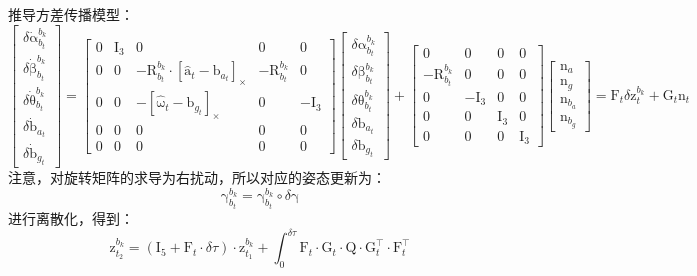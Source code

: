 \documentclass[12pt, onecolumn]{article}
\newcommand\liehat[1]{\left[ #1 \right]_\times}
\newcommand\bsm[1]{\boldsymbol{\mathrm{#1}}}
\newcommand\rotation[2]{{\bsm{R}_{#1}^{#2}}}
\begin{document}
	推导方差传播模型：
	\begin{equation}
	\begin{bmatrix}
	\delta\dot{\bsm{\alpha}}_{b_{t}}^{b_k}
	\\
	\delta\dot{\bsm{\beta}}_{b_{t}}^{b_k}
	\\
	\delta\dot{\bsm{\theta}}_{b_{t}}^{b_k}
	\\
	\delta\dot{\bsm{b}}_{a_{t}}
	\\
	\delta\dot{\bsm{b}}_{g_{t}}
	\end{bmatrix}=
	\begin{bmatrix}
	0&\bsm{I}_3&0&0&0\\
	0&0&-\rotation{b_t}{b_{k}}\cdot\liehat{\hat{\bsm{a}}_t-\bsm{b}_{a_t}}&-\rotation{b_t}{b_{k}}&0\\
	0&0&-\liehat{\hat{\bsm{\omega}}_t-\bsm{b}_{g_t}}&0&-\bsm{I}_3\\
	0&0&0&0&0\\0&0&0&0&0
	\end{bmatrix}
	\begin{bmatrix}
	\delta{\bsm{\alpha}}_{b_{t}}^{b_k}
	\\
	\delta{\bsm{\beta}}_{b_{t}}^{b_k}
	\\
	\delta{\bsm{\theta}}_{b_{t}}^{b_k}
	\\
	\delta{\bsm{b}}_{a_{t}}
	\\
	\delta{\bsm{b}}_{g_{t}}
	\end{bmatrix}+
	\begin{bmatrix}
	0&0&0&0\\
	-\rotation{b_t}{b_{k}}&0&0&0\\
	0&-\bsm{I}_3&0&0\\
	0&0&\bsm{I}_3&0\\
	0&0&0&\bsm{I}_3
	\end{bmatrix}\begin{bmatrix}
	\bsm{n}_a\\\bsm{n}_g\\\bsm{n}_{b_a}\\\bsm{n}_{b_g}
	\end{bmatrix}=\bsm{F}_t\delta\bsm{z}^{b_k}_{t}+\bsm{G}_{t}\bsm{n}_{t}
	\end{equation}
	注意，对旋转矩阵的求导为右扰动，所以对应的姿态更新为：
	\begin{equation}
	\bsm{\gamma}_{b_{t}}^{b_k}=\bsm{\gamma}_{b_{t}}^{b_k}\circ\delta\bsm{\gamma}
	\end{equation}
	进行离散化，得到：
	\begin{equation}
	\bsm{z}^{b_k}_{t_2}=\left( \bsm{I}_5+\bsm{F}_t\cdot\delta\tau\right)\cdot\bsm{z}^{b_k}_{t_1} +
	\int_{0}^{\delta \tau}\bsm{F}_t\cdot\bsm{G}_t\cdot\bsm{Q}\cdot\bsm{G}_t^\top\cdot\bsm{F}_t^\top
	\end{equation}
\end{document}
